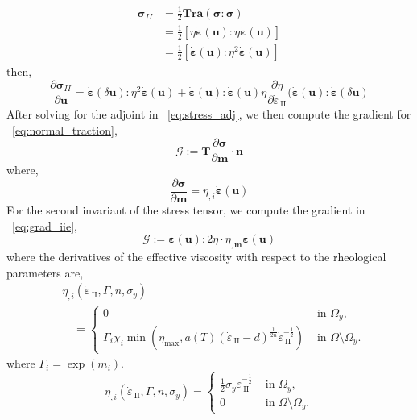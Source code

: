 \documentclass[12pt]{article}
\newcommand{\IIinv}{{\dot\varepsilon}_{\mathrm{\!\!\:II}}}
\newcommand{\mm}{{\ensuremath{\boldsymbol{m}}}}
\newcommand{\uu}{{\ensuremath{\boldsymbol{u}}}}
\newcommand{\ssigma}{{\ensuremath{\boldsymbol{\sigma}}}}
\newcommand{\strain}{{\ensuremath{\dot{\boldsymbol{\varepsilon}}}}}
\begin{document}
\begin{equation}
  \begin{split}
 \ssigma_{II}& = \frac{1}{2}\textbf{Tra}(\ssigma:\ssigma) \\
 & = \frac{1}{2}[\eta\strain(\uu):\eta\strain(\uu)]\\
             & = \frac{1}{2}[\strain(\uu):\eta^2\strain(\uu)]
\end{split}
\end{equation}
then,
\begin{equation}
    \frac{\partial \ssigma_{II}}{\partial \uu} = \strain(\delta \uu):\eta^2\strain(\uu) +
 \strain(\uu):\strain(\uu)\eta\frac{\partial\eta}{\partial \IIinv}(\strain(\uu):\strain(\delta\uu)
\label{eq:stress_adj}
\end{equation}
After solving for the adjoint in ~\eqref{eq:stress_adj}, we then compute the gradient for ~\eqref{eq:normal_traction},
\begin{equation}
\mathcal{G}:=  \textbf{T}\frac{\partial{\ssigma}}{{\partial \mm}}\cdot \textbf{n}
\end{equation}
where,
\begin{equation}
\frac{\partial \ssigma}{\partial \mm} = \eta_{,i}\strain(\uu)
\end{equation}
For the second invariant of the stress tensor, we compute the gradient in ~\eqref{eq:grad_iie}, 
\begin{equation}
\mathcal G:=  \strain(\uu):2\eta\cdot\eta_{,\mm}\strain(\uu)
\label{eq:grad_iie}
\end{equation}
where the derivatives of the effective viscosity with respect to the rheological parameters are,
\begin{align*}
  &\eta_{,i}(\IIinv,\Gamma,n,\sigma_y) \\
  &\quad=\begin{cases}
    0 & \text{ in } \Omega_y,\\
    \Gamma_i\chi_i\min(\eta_{\max},a(T)(\IIinv-d)^{\frac{1}{2n}}\IIinv^{-\frac{1}{2}})
    & \text{ in } \Omega\setminus\Omega_y.
  \end{cases}
\end{align*}
where $\Gamma_i = \exp(m_i)$.
\begin{equation*}
  \eta_{,i}(\IIinv,\Gamma,n,\sigma_y) =
  \begin{cases}
    \frac{1}{2}\sigma_y\IIinv^{-\frac{1}{2}} & \text{ in } \Omega_y,\\
    0                          & \text{ in } \Omega\setminus\Omega_y.
  \end{cases}
  \end{equation*}
\end{document}
